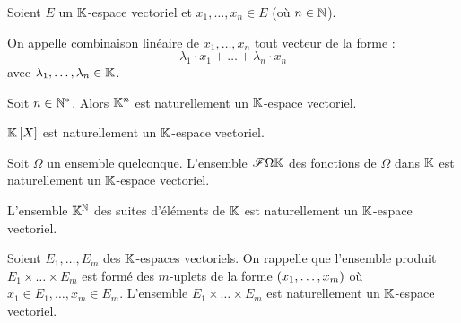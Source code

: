 \begin{defi}
Soient \(E\) un \(\mathbb{K}\)-espace vectoriel et \(x_1,\dots,x_n\in E\) (où \(n\in\mathbb{N}\)).

On appelle combinaison linéaire de \(x_1,\dots,x_n\) tout vecteur de la forme : \[\lambda_1\cdot x_1+\dots+\lambda_n\cdot x_n\] avec \(\lambda_1,\dots,\lambda_n\in\mathbb{K}\).
\end{defi}

\begin{ex}
Soit \(n\in\mathbb{N}^*\). Alors \(\mathbb{K}^n\) est naturellement un \(\mathbb{K}\)-espace vectoriel.

\(\poly\) est naturellement un \(\mathbb{K}\)-espace vectoriel.

Soit \(\Omega\) un ensemble quelconque. L'ensemble \(\mathscr{F}{\Omega}{\mathbb{K}}\) des fonctions de \(\Omega\) dans \(\mathbb{K}\) est naturellement un \(\mathbb{K}\)-espace vectoriel.

L'ensemble \(\mathbb{K}^{\mathbb{N}}\) des suites d'éléments de \(\mathbb{K}\) est naturellement un \(\mathbb{K}\)-espace vectoriel.

Soient \(E_1,\dots,E_m\) des \(\mathbb{K}\)-espaces vectoriels. On rappelle que l'ensemble produit \(E_1\times\dots\times E_m\) est formé des \(m\)-uplets de la forme \(\left(x_1,\dots,x_m\right)\) où \(x_1\in E_1,\dots,x_m\in E_m\). L'ensemble \(E_1\times\dots\times E_m\) est naturellement un \(\mathbb{K}\)-espace vectoriel.
\end{ex}

